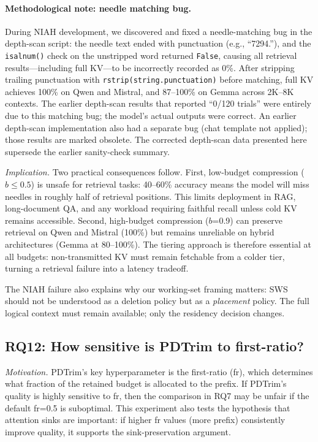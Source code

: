 \documentclass[11pt]{article}
\newcommand{\sws}{SWS}
\newcommand{\pct}{\%}
\theoremstyle{definition}
\theoremstyle{plain}
\begin{document}
\paragraph{Methodological note: needle matching bug.}  During NIAH development, we discovered and fixed a needle-matching bug in the depth-scan script: the needle text ended with punctuation (e.g., ``7294.''), and the \texttt{isalnum()} check on the unstripped word returned \texttt{False}, causing all retrieval results---including full KV---to be incorrectly recorded as 0\pct{}.  After stripping trailing punctuation with \texttt{rstrip(string.punctuation)} before matching, full KV achieves 100\pct{} on Qwen and Mistral, and 87--100\pct{} on Gemma across 2K--8K contexts.  The earlier depth-scan results that reported ``0/120 trials'' were entirely due to this matching bug; the model's actual outputs were correct.  An earlier depth-scan implementation also had a separate bug (chat template not applied); those results are marked obsolete.  The corrected depth-scan data presented here supersede the earlier sanity-check summary.

\emph{Implication.}  Two practical consequences follow.  First, low-budget compression ($b \leq 0.5$) is unsafe for retrieval tasks: 40--60\pct{} accuracy means the model will miss needles in roughly half of retrieval positions.  This limits deployment in RAG, long-document QA, and any workload requiring faithful recall unless cold KV remains accessible.  Second, high-budget compression ($b$=0.9) can preserve retrieval on Qwen and Mistral (100\pct{}) but remains unreliable on hybrid architectures (Gemma at 80--100\pct{}).  The tiering approach is therefore essential at all budgets: non-transmitted KV must remain fetchable from a colder tier, turning a retrieval failure into a latency tradeoff.

The NIAH failure also explains why our working-set framing matters: \sws{} should not be understood as a deletion policy but as a \emph{placement} policy.  The full logical context must remain available; only the residency decision changes.

\subsection{RQ12: How sensitive is PDTrim to first-ratio?}
\label{sec:rq12}

\emph{Motivation.}  PDTrim's key hyperparameter is the first-ratio (fr), which determines what fraction of the retained budget is allocated to the prefix.  If PDTrim's quality is highly sensitive to fr, then the comparison in RQ7 may be unfair if the default fr=0.5 is suboptimal.  This experiment also tests the hypothesis that attention sinks are important: if higher fr values (more prefix) consistently improve quality, it supports the sink-preservation argument.
\end{document}
